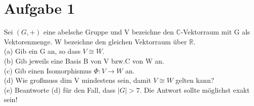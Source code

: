 \documentclass{scrartcl}
\begin{document}
\section*{Aufgabe 1}
Sei $(G,+)$ eine abelsche Gruppe und V bezeichne den $\mathbb{C}$-Vektorraum mit G als Vektorenmenge. W bezeichne den gleichen Vektorraum \"uber $\mathbb{R}$.\\
(a) Gib ein G an, so dass $V \cong W$.\\
(b) Gib jeweils eine Basis B von V bzw.C von W an.\\
(c) Gib einen Isomorphismus $\Phi \colon V\rightarrow W$ an.\\
(d) Wie gro\ss muss dim V mindestens sein, damit $V \cong W$ gelten kann?\\
(e) Beantworte (d) f\"ur den Fall, dass $|G|>7$. Die Antwort sollte m\"oglichst exakt sein!
\end{document}

